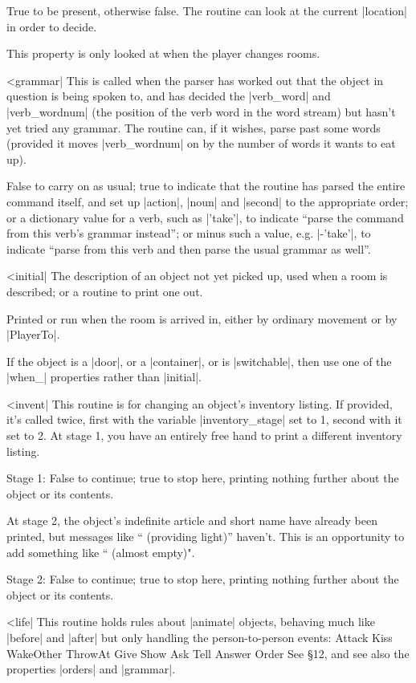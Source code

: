 {{{\rr True to be present, otherwise false.  The routine can look
at the current |location| in order to decide.

\warn This property is only looked at when the player changes rooms.

^^|grammar|
\fato  This is called when the
parser has worked out that the object in question is being spoken
to, and has decided the |verb_word| and |verb_wordnum| (the position
of the verb word in the word stream) but hasn't yet tried any grammar.
The routine can, if it wishes, parse past some words (provided it
moves |verb_wordnum| on by the number of words it wants to eat up).

\rr  False to carry on as usual; true to indicate that the routine
has parsed the entire command itself, and set up |action|, |noun|
and |second| to the appropriate order; or a dictionary value for
a verb, such as |'take'|, to indicate ``parse the command from this
verb's grammar instead''; or minus such a value, e.g. |-'take'|,
to indicate ``parse from this verb and then parse the usual
grammar as well''.

^^|initial|
\fo The description of an object not yet picked up, used when a
room is described; or a routine to print one out.

\fr Printed or run when the room is arrived in, either by ordinary
movement or by |PlayerTo|.

\warn If the object is a |door|, or a |container|, or is |switchable|,
then use one of the |when_| properties rather than |initial|.

\nrr

^^|invent|
This routine is for changing an object's inventory listing.  If provided,
it's called twice, first with the variable |inventory_stage| set to 1,
second with it set to 2.  At stage 1, you have an entirely free hand to
print a different inventory listing.

\rr Stage 1: False to continue; true to stop here, printing nothing further
about the object or its contents.

\noindent At stage 2, the object's indefinite article and short name have
already been printed, but messages like `` (providing light)'' haven't. 
This is an opportunity to add something like `` (almost empty)".

\rr Stage 2: False to continue; true to stop here, printing nothing further
about the object or its contents.

^^|life|
This routine holds rules about |animate| objects, behaving much like
|before| and |after| but only handling the person-to-person events:
\beginstt
Attack Kiss WakeOther ThrowAt Give Show Ask Tell Answer Order
\endtt
See \S 12, and see also the properties |orders| and |grammar|.

}}}
